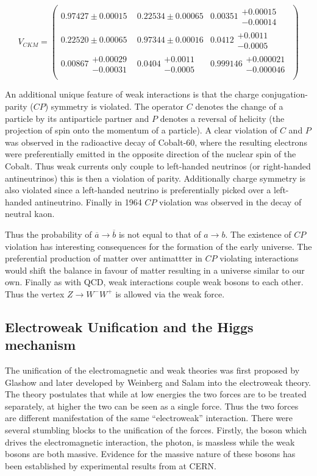 \begin{equation}
\label{eq:TheoryWeakCKM}
V_{CKM}
=
\begin{pmatrix}
  0.97427\pm0.00015 & 0.22534\pm0.00065 & 0.00351\substack{+0.00015\\-0.00014} \\
  0.22520\pm0.00065 & 0.97344\pm0.00016 & 0.0412\substack{+0.0011\\-0.0005} \\
  0.00867\substack{+0.00029\\-0.00031} & 0.0404\substack{+0.0011\\-0.0005} & 0.999146\substack{+0.000021\\-0.000046} \\
\end{pmatrix}
\end{equation}

An additional unique feature of weak interactions is that the charge conjugation-parity ($CP$) symmetry is violated. The operator $C$ denotes the change of a particle by its antiparticle partner and $P$ denotes a reversal of helicity (the projection of spin onto the momentum of a particle). A clear violation of $C$ and $P$ was observed in the radioactive decay of Cobalt-60, where the resulting electrons were preferentially emitted in the opposite direction of the nuclear spin of the Cobalt. Thus weak currents only couple to left-handed neutrinos (or right-handed antineutrinos) this is then a violation of parity. Additionally charge symmetry is also violated since a left-handed neutrino is preferentially picked over a left-handed antineutrino. Finally in 1964 $CP$ violation was observed in the decay of neutral kaon.

Thus the probability of $\overline{a}\rightarrow \overline{b}$ is not equal to that of $a\rightarrow b$. The existence of $CP$ violation has interesting consequences for the formation of the early universe. The preferential production of matter over antimattter in $CP$ violating interactions would shift the balance in favour of matter resulting in a universe similar to our own. Finally as with QCD, weak interactions couple weak bosons to each other. Thus the vertex $Z\rightarrow W^-W^+$ is allowed via the weak force.

\subsection{Electroweak Unification and the Higgs mechanism}

The unification of the electromagnetic and weak theories was first proposed by Glashow and later developed by Weinberg and Salam into the electroweak theory. The theory postulates that while at low energies the two forces are to be treated separately, at higher the two can be seen as a single force. Thus the two forces are different manifestation of the same ``electroweak'' interaction. There were several stumbling blocks to the unification of the forces. Firstly, the boson which drives the electromagnetic interaction, the photon, is massless while the weak bosons are both massive. Evidence for the massive nature of these bosons has been established by experimental results from  at CERN.

